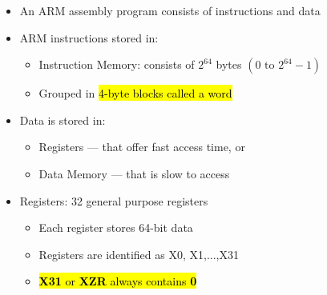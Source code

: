 \begin{frame}[fragile]

\begin{itemize}
\item An ARM assembly program consists of instructions and data
\item ARM instructions stored in:
    \begin{itemize}
        \item Instruction Memory: consists of $2^{64}$ bytes $(0 \text{ to } 2^{64}-1)$
        \item Grouped in \hl{4-byte blocks called a word}
    \end{itemize}
\item Data is stored in:
	\begin{itemize}
		\item Registers --- that offer fast access time, or
		\item Data Memory --- that is slow to access
	\end{itemize}
  \item Registers: 32 general purpose registers
  \begin{itemize}
 \item Each register stores 64-bit data
 \item Registers are identified as X0, X1,...,X31
 \item \hl{\textbf{X31} or \textbf{XZR} always contains \textbf{0}}
\end{itemize}

\end{itemize}
\end{frame}
